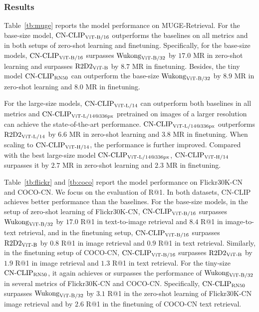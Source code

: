 \subsubsection{Results}
\label{subsubsec:results}
Table~\ref{tb:muge} reports the model performance on MUGE-Retrieval. For the base-size model, $\text{CN-CLIP}\rm_{ViT\text{-}B/16}$ outperforms the baselines on all metrics and in both setups of zero-shot learning and finetuning. 
Specifically, for the base-size models, $\text{CN-CLIP}\rm_{ViT\text{-}B/16}$ surpasses $\text{Wukong}\rm_{ViT\text{-}B/32}$ by $17.0$ MR in zero-shot learning and surpasses $\text{R2D2}\rm_{ViT\text{-}B}$ by $8.7$ MR in finetuning. 
Besides, the tiny model $\text{CN-CLIP}\rm_{RN50}$ can outperform the base-size $\text{Wukong}\rm_{ViT\text{-}B/32}$ by $8.9$ MR in zero-shot learning and $8.0$ MR in finetuning. 

For the large-size models, $\text{CN-CLIP}\rm_{ViT\text{-}L/14}$ can outperform both baselines in all metrics and $\text{CN-CLIP}\rm_{ViT\text{-}L/14@336px}$ pretrained on images of a larger resolution can achieve the state-of-the-art performance. $\text{CN-CLIP}\rm_{ViT\text{-}L/14@336px}$ outperforms $\text{R2D2}\rm_{ViT\text{-}L/14}$ by $6.6$ MR in zero-shot learning and $3.8$ MR in finetuning. 
When scaling to $\text{CN-CLIP}\rm_{ViT\text{-}H/14}$, the performance is further improved. Compared with the best large-size model $\text{CN-CLIP}\rm_{ViT\text{-}L/14@336px}$, $\text{CN-CLIP}\rm_{ViT\text{-}H/14}$ surpasses it by $2.7$ MR in zero-shot learning and $2.3$ MR in finetuning. 

Table~\ref{tb:flickr} and \ref{tb:coco} report the model performance on Flickr30K-CN and COCO-CN. 
We focus on the evaluation of R@1. 
In both datasets, $\text{CN-CLIP}$ achieves better performance than the baselines. 
For the base-size models, in the setup of zero-shot learning of Flickr30K-CN, $\text{CN-CLIP}\rm_{ViT\text{-}B/16}$ surpasses $\text{Wukong}\rm_{ViT\text{-}B/32}$ by $17.0$ R@1 in text-to-image retrieval and $8.4$ R@1 in image-to-text retrieval, and in the finetuning setup, $\text{CN-CLIP}\rm_{ViT\text{-}B/16}$ surpasses $\text{R2D2}\rm_{ViT\text{-}B}$ by $0.8$ R@1 in image retrieval and $0.9$ R@1 in text retrieval. 
Similarly, in the finetuning setup of COCO-CN, $\text{CN-CLIP}\rm_{ViT\text{-}B/16}$ surpasses $\text{R2D2}\rm_{ViT\text{-}B}$ by $1.9$ R@1 in image retrieval and $1.3$ R@1 in text retrieval. For the tiny-size $\text{CN-CLIP}\rm_{RN50}$, it again achieves or surpasses the performance of $\text{Wukong}\rm_{ViT\text{-}B/32}$ in several metrics of Flickr30K-CN and COCO-CN. Specifically, $\text{CN-CLIP}\rm_{RN50}$ surpasses $\text{Wukong}\rm_{ViT\text{-}B/32}$ by $3.1$ R@1 in the zero-shot learning of Flickr30K-CN image retrieval and by $2.6$ R@1 in the finetuning of COCO-CN text retrieval.

